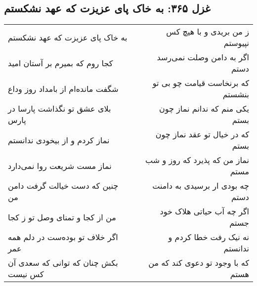 \begin{center}
\section*{غزل ۳۶۵: به خاک پای عزیزت که عهد نشکستم}
\label{sec:365}
\begin{longtable}{l p{0.5cm} r}
به خاک پای عزیزت که عهد نشکستم
&&
ز من بریدی و با هیچ کس نپیوستم
\\
کجا روم که بمیرم بر آستان امید
&&
اگر به دامن وصلت نمی‌رسد دستم
\\
شگفت مانده‌ام از بامداد روز وداع
&&
که برنخاست قیامت چو بی تو بنشستم
\\
بلای عشق تو نگذاشت پارسا در پارس
&&
یکی منم که ندانم نماز چون بستم
\\
نماز کردم و از بیخودی ندانستم
&&
که در خیال تو عقد نماز چون بستم
\\
نماز مست شریعت روا نمی‌دارد
&&
نماز من که پذیرد که روز و شب مستم
\\
چنین که دست خیالت گرفت دامن من
&&
چه بودی ار برسیدی به دامنت دستم
\\
من از کجا و تمنای وصل تو ز کجا
&&
اگر چه آب حیاتی هلاک خود جستم
\\
اگر خلاف تو بوده‌ست در دلم همه عمر
&&
نه نیک رفت خطا کردم و ندانستم
\\
بکش چنان که توانی که سعدی آن کس نیست
&&
که با وجود تو دعوی کند که من هستم
\\
\end{longtable}
\end{center}
